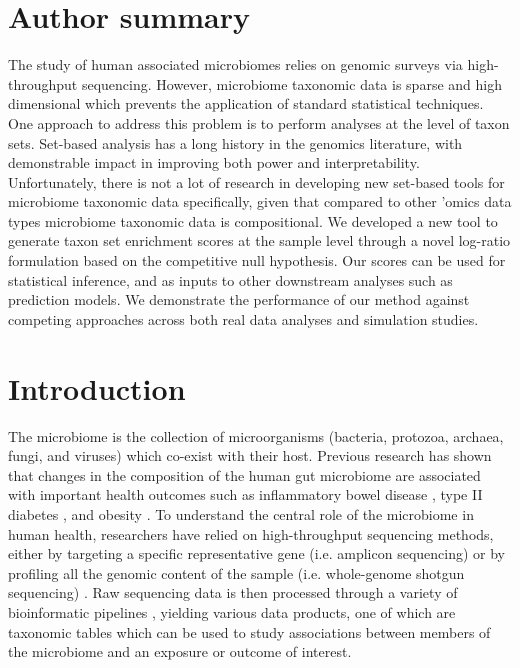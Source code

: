 \documentclass[10pt,letterpaper]{article}
\begin{document}
\section*{Author summary}
The study of human associated microbiomes relies on genomic surveys via high-throughput sequencing. However, microbiome taxonomic data is sparse and high dimensional which prevents the application of standard statistical techniques. One approach to address this problem is to perform analyses at the level of taxon sets. Set-based analysis has a long history in the genomics literature, with demonstrable impact in improving both power and interpretability. Unfortunately, there is not a lot of research in developing new set-based tools for microbiome taxonomic data specifically, given that compared to other 'omics data types microbiome taxonomic data is compositional. We developed a new tool to generate taxon set enrichment scores at the sample level through a novel log-ratio formulation based on the competitive null hypothesis. Our scores can be used for statistical inference, and as inputs to other downstream analyses such as prediction models. We demonstrate the performance of our method against competing approaches across both real data analyses and simulation studies. 

\linenumbers

\section*{Introduction}
The microbiome is the collection of microorganisms (bacteria, protozoa, archaea, fungi, and viruses) which co-exist with their host. Previous research has shown that changes in the composition of the human gut microbiome are associated with important health outcomes such as inflammatory bowel disease \cite{proctor2019}, type II diabetes \cite{sharma2019a}, and obesity \cite{aoun2020}. To understand the central role of the microbiome in human health, researchers have relied on high-throughput sequencing methods, either by targeting a specific representative gene (i.e. amplicon sequencing) or by profiling all the genomic content of the sample (i.e. whole-genome shotgun sequencing) \cite{cho2012}. Raw sequencing data is then processed through a variety of bioinformatic pipelines \cite{callahan2016, truong2015}, yielding various data products, one of which are taxonomic tables which can be used to study associations between members of the microbiome and an exposure or outcome of interest. 
\end{document}
